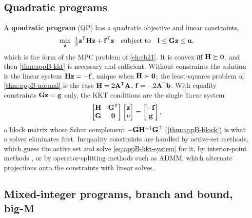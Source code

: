 \subsection{Quadratic programs}
\label{sec:appB-qp}

A \textbf{quadratic program} (QP) has a quadratic
objective and linear constraints,
\begin{equation}
  \min_{\vect{z}}\ \tfrac12\vect{z}\T\mat{H}\vect{z} + \vect{f}\T\vect{z}\quad \st \vect{l} \le \mat{G}\vect{z} \le \vect{u},
  \label{eq:appB-qp}
\end{equation}
which is the form of the MPC problem of \cref{ch:ch21}. It is convex iff
$\mathbf{H} \succeq \mathbf{0}$, and then \cref{thm:appB-kkt} is necessary and
sufficient. Without constraints the solution is the linear system
$\mathbf{H}\mathbf{z} = -\mathbf{f}$, unique when $\mathbf{H} \succ \mathbf{0}$; the
least-squares problem of \cref{thm:appB-normal} is the case $\mathbf{H} =
2\mathbf{A}^{\mathsf{T}}\mathbf{A}$, $\mathbf{f} = -2\mathbf{A}^{\mathsf{T}}\mathbf{b}$. With equality
constraints $\mathbf{G}\mathbf{z} = \mathbf{g}$ only, the KKT conditions are the
single linear system
\begin{equation}
  \begin{bmatrix}\mathbf{H} & \mathbf{G}^{\mathsf{T}}\\ \mathbf{G} & \mathbf{0}\end{bmatrix}
  \begin{bmatrix}\mathbf{z}\\ \mathbf{\nu}\end{bmatrix} =
  \begin{bmatrix}-\mathbf{f}\\ \mathbf{g}\end{bmatrix},
  \label{eq:appB-kkt-system}
\end{equation}
a block matrix whose Schur complement $-\mathbf{G}\mathbf{H}^{-1}\mathbf{G}^{\mathsf{T}}$
(\cref{thm:appB-block}) is what a solver eliminates first. Inequality
constraints are handled by active-set methods, which guess the active set and
solve \cref{eq:appB-kkt-system} for it, by interior-point methods
\cite{nocedal2006numerical}, or by operator-splitting methods such as ADMM,
which alternate projections onto the constraints with linear solves.

\subsection{Mixed-integer programs, branch and bound, big-M}
\label{sec:appB-milp}

